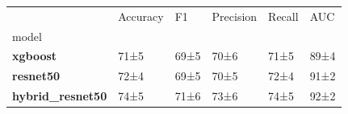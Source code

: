 \begin{tabular}{llllll}
\toprule
 & Accuracy & F1 & Precision & Recall & AUC \\
model &  &  &  &  &  \\
\midrule
\textbf{xgboost} & 71±5 & 69±5 & 70±6 & 71±5 & 89±4 \\
\textbf{resnet50} & 72±4 & 69±5 & 70±5 & 72±4 & 91±2 \\
\textbf{hybrid_resnet50} & 74±5 & 71±6 & 73±6 & 74±5 & 92±2 \\
\bottomrule
\end{tabular}
